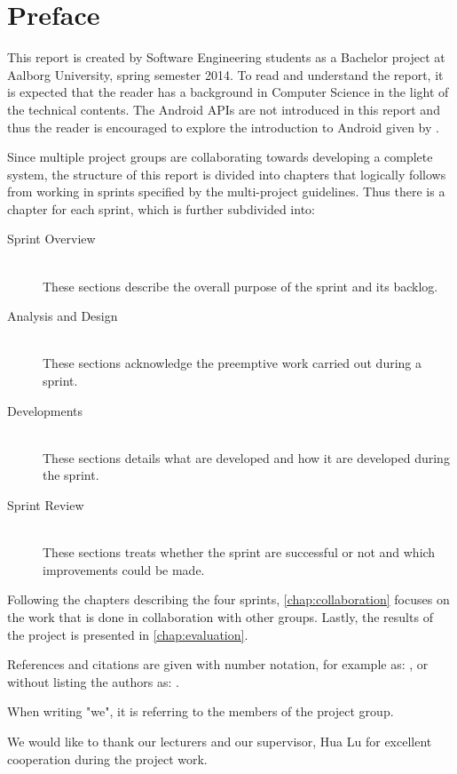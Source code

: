 \newcommand{\headerPreface}{Preface}
\cleardoublepage
{}
\pdfbookmark{\headerPreface}{chap:preface}
\chapter*{\headerPreface}\label{chap:preface}
This report is created by Software Engineering students as a Bachelor project at Aalborg University, spring semester 2014.
To read and understand the report, it is expected that the reader has a background in Computer Science in the light of the technical contents.
The Android APIs are not introduced in this report and thus the reader is encouraged to explore the introduction to Android given by \citet{androidIntroduction}.

Since multiple project groups are collaborating towards developing a complete system, the structure of this report is divided into chapters that logically follows from working in sprints specified by the multi-project guidelines.
Thus there is a chapter for each sprint, which is further subdivided into:

\begin{description}
\item[Sprint Overview] \hfill \\
These sections describe the overall purpose of the sprint and its backlog.
\item[Analysis and Design] \hfill \\
These sections acknowledge the preemptive work carried out during a sprint.
\item[Developments] \hfill \\
These sections details what are developed and how it are developed during the sprint.
\item[Sprint Review] \hfill \\
These sections treats whether the sprint are successful or not and which improvements could be made.
\end{description}

Following the chapters describing the four sprints, \cref{chap:collaboration} focuses on the work that is done in collaboration with other groups.
Lastly, the results of the project is presented in \cref{chap:evaluation}.

References and citations are given with number notation, for example as: \citet{launcher2011}, or without listing the authors as: \cite{launcher2011}. 

When writing "we", it is referring to the members of the project group.

We would like to thank our lecturers and our supervisor, Hua Lu for excellent cooperation during the project work.
